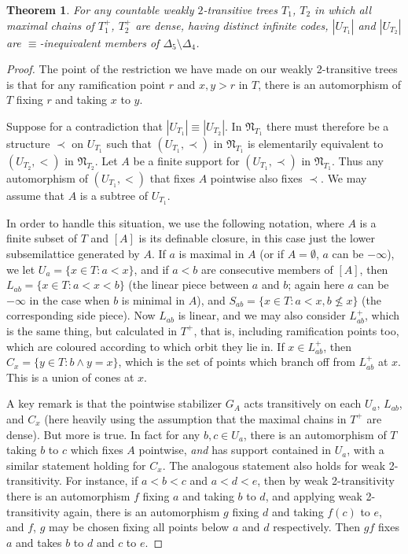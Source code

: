 \documentclass[a4paper,reqno]{amsart}
\numberwithin{equation}{section}
\newtheorem{theorem}{Theorem}[section]
\begin{document}
\begin{theorem}  \label{3.2} For any countable weakly $2$-transitive trees $T_1$, $T_2$ in which all maximal chains
of $T_1^+$, $T_2^+$ are dense, having distinct infinite codes, $|U_{T_1}|$ and $|U_{T_2}|$ are $\equiv$-inequivalent 
members of $\Delta_5 \setminus \Delta_4$.   \end{theorem}

\begin{proof}  The point of the restriction we have made on our weakly 2-transitive trees is that for any
ramification point $r$ and $x, y > r$ in $T$, there is an automorphism of $T$ fixing $r$ and taking $x$ to $y$.

Suppose for a contradiction that $|U_{T_1}| \equiv |U_{T_2}|$. In ${\mathfrak N}_{T_1}$ there must therefore be a 
structure $\prec$ on $U_{T_1}$ such that $(U_{T_1}, \prec)$ in ${\mathfrak N}_{T_1}$ is elementarily equivalent to 
$(U_{T_2}, <)$ in ${\mathfrak N}_{T_2}$. Let $A$ be a finite support for $(U_{T_1}, \prec)$ in ${\mathfrak N}_{T_1}$. 
Thus any automorphism of $(U_{T_1}, <)$ that fixes $A$ pointwise also fixes $\prec$. We may assume that $A$ is a 
subtree of $U_{T_1}$.

In order to handle this situation, we use the following notation, where $A$ is a finite subset of $T$ and $[A]$ 
is its definable closure, in this case just the lower subsemilattice generated by $A$. If $a$ is maximal in $A$ 
(or if $A = \emptyset$, $a$ can be $-\infty$), we let $U_a = \{x \in T: a < x\}$, and if $a < b$ are consecutive 
members of $[A]$, then $L_{ab} = \{x \in T: a < x < b\}$ (the linear piece between $a$ and $b$; again here $a$ 
can be $-\infty$ in the case when $b$ is minimal in $A$), and $S_{ab} = \{x \in T: a < x, b \not \le x\}$ (the 
corresponding side piece). Now $L_{ab}$ is linear, and we may also consider $L_{ab}^+$, which is the same thing, 
but calculated in $T^+$, that is, including ramification points too, which are coloured according to which orbit 
they lie in. If $x \in L_{ab}^+$, then $C_x = \{y \in T: b \wedge y = x\}$, which is the set of points which 
branch off from $L_{ab}^+$ at $x$. This is a union of cones at $x$.

A key remark is that the pointwise stabilizer $G_A$ acts transitively on each $U_a$, $L_{ab}$, and $C_x$ (here heavily 
using the assumption that the maximal chains in $T^+$ are dense). But more is true. 
In fact for any $b, c \in U_a$, there is an automorphism of $T$ taking $b$ to $c$ which fixes $A$ pointwise, {\em and} has
support contained in $U_a$, with a similar statement holding for $C_x$. The analogous statement also holds for
weak 2-transitivity. For instance, if $a < b < c$ and $a < d < e$, then by weak 2-transitivity there is an 
automorphism $f$ fixing $a$ and taking $b$ to $d$, and applying weak 2-transitivity again, there is an automorphism
$g$ fixing $d$ and taking $f(c)$ to $e$, and $f$, $g$ may be chosen fixing all points below $a$ and $d$ respectively.
Then $gf$ fixes $a$ and takes $b$ to $d$ and $c$ to $e$.


\end{proof}
\end{document}
